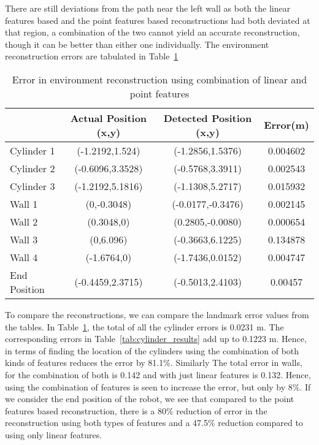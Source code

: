 There are still deviations from the path near the left wall as both the linear features based and the point features based reconstructions had both deviated at that region, a combination of the two cannot yield an accurate reconstruction, though it can be better than either one individually. The environment reconstruction errors are tabulated in Table~\ref{tab:combo_results}

\begin{table}
\caption{Error in environment reconstruction using combination of linear and point features}
\label{tab:combo_results}
\begin{tabular}{| l | c | c | c |}
\hline ~ & Actual Position (x,y) & Detected Position (x,y) & Error(m)\\
\hline Cylinder 1 & (-1.2192,1.524) & (-1.2856,1.5376) & 0.004602 \\ 
\hline Cylinder 2 & (-0.6096,3.3528) & (-0.5768,3.3911) & 0.002543 \\ 
\hline Cylinder 3 & (-1.2192,5.1816) & (-1.1308,5.2717) & 0.015932 \\
\hline Wall 1 & (0,-0.3048) & (-0.0177,-0.3476) & 0.002145 \\ 
\hline Wall 2 & (0.3048,0) & (0.2805,-0.0080) & 0.000654 \\ 
\hline Wall 3 & (0,6.096) & (-0.3663,6.1225) & 0.134878 \\ 
\hline Wall 4 & (-1.6764,0) & (-1.7436,0.0152) & 0.004747 \\
\hline End Position & (-0.4459,2.3715) & (-0.5013,2.4103) & 0.00457 \\
\hline 
\end{tabular} 
\end{table}

To compare the reconstructions, we can compare the landmark error values from the tables. In Table~\ref{tab:combo_results}, the total of all the cylinder errors is 0.0231 m. The corresponding errors in Table~\ref{tab:cylinder_results} add up to 0.1223 m. Hence, in terms of finding the location of the cylinders using the combination of both kinds of features reduces the error by 81.1\%. Similarly The total error in walls, for the combination of both is 0.142 and with just linear features is 0.132. Hence, using the combination of features is seen to increase the error, but only by 8\%. If we consider the end position of the robot, we see that compared to the point features based reconstruction, there is a 80\% reduction of error in the reconstruction using both types of features and a 47.5\% reduction compared to using only linear features. 

